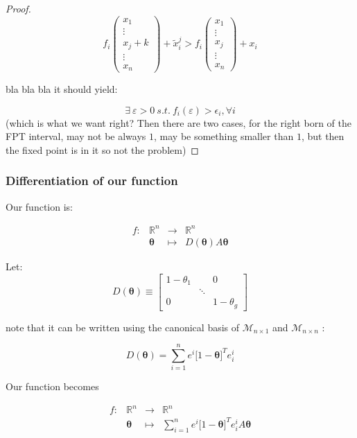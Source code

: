 \documentclass[12pt]{article}
\begin{document}
\begin{proof}
\[  f_i \left( \begin{array}{c} x_1 \\ \vdots \\ x_j + k \\ \vdots \\ x_n \end{array} \right) + \tilde{x}^j_i>f_i \left( \begin{array}{c} x_1 \\ \vdots \\ x_j \\ \vdots \\ x_n \end{array} \right) + x_i  \]

bla bla bla it should yield:

\[ \exists \ \varepsilon >0 \ s.t. \ f_i(\varepsilon) > \epsilon_i, \forall i \] 
(which is what we want right? Then there are two cases, for the right born of the FPT interval, may not be always $1$, may be something smaller than $1$, but then the fixed point is in it so not the problem)

\end{proof}

\subsubsection{Differentiation of our function}

Our function is:

\[ \begin{array}{lccc}
 f : & \mathbb{R}^n & \rightarrow & \mathbb{R}^n \\
 & \bm{\theta} & \mapsto & D(\bm{\theta}) A \bm{\theta} \end{array} \]

Let:
\[ D(\bm{\theta}) \equiv \begin{bmatrix} 1- \theta_1 & & 0 \\  & \ddots & \\ 0 & & 1-\theta_g \end{bmatrix} \]

note that it can be written using the canonical basis of $\mathcal{M}_{n \times 1}$ and  $\mathcal{M}_{n \times n}$ :

\[D(\bm{\theta})=\sum_{i=1}^{n} e^i \big[1-\bm{\theta} \big]^T e_i^i \]

Our function becomes

\[ \begin{array}{lccc}
 f : & \mathbb{R}^n & \rightarrow & \mathbb{R}^n \\
 & \bm{\theta} & \mapsto & \sum_{i=1}^{n} e^i \big[1-\bm{\theta} \big]^T e_i^i A \bm{\theta} \end{array} \]
\end{document}
